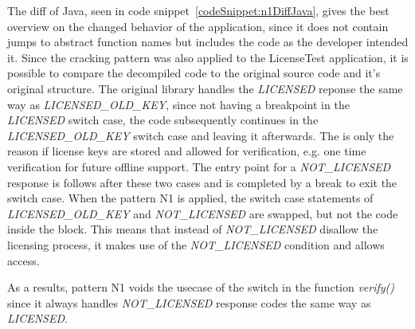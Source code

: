 The diff of Java, seen in code snippet~\ref{codeSnippet:n1DiffJava}, gives the best overview on the changed behavior of the application, since it does not contain jumps to abstract function names but includes the code as the developer intended it.
Since the cracking pattern was also applied to the LicenseTest application, it is possible to compare the decompiled code to the original source code and it's original structure.
The original library handles the \textit{LICENSED} reponse the same way as \textit{LICENSED\_OLD\_KEY}, since not having a breakpoint in the \textit{LICENSED} switch case, the code subsequently continues in the \textit{LICENSED\_OLD\_KEY} switch case and leaving it afterwards.
The is only the reason if license keys are stored and allowed for verification, e.g. one time verification for future offline support.
The entry point for a \textit{NOT\_LICENSED} response is follows after these two cases and is completed by a break to exit the switch case.
When the pattern N1 is applied, the switch case statements of \textit{LICENSED\_OLD\_KEY} and \textit{NOT\_LICENSED} are swapped, but not the code inside the block.
This means that instead of \textit{NOT\_LICENSED} disallow the licensing process, it makes use of the \textit{NOT\_LICENSED} condition and allows access.
\newline


As a results, pattern N1 voids the usecase of the switch in the function \textit{verify()} since it always handles \textit{NOT\_LICENSED} response codes the same way as \textit{LICENSED}.


